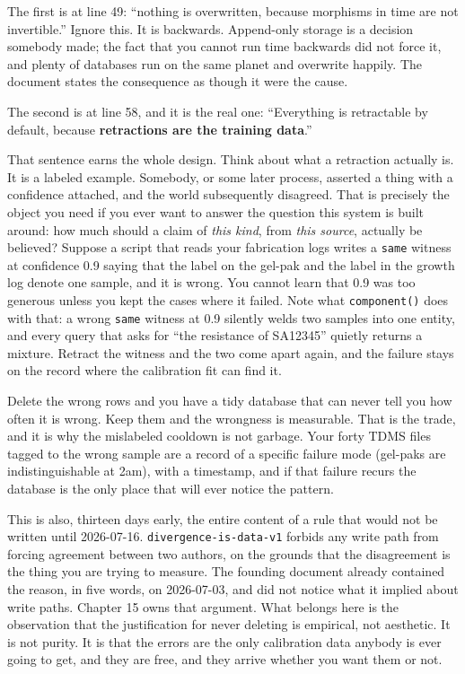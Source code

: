 The first is at line 49: ``nothing is overwritten, because morphisms in time are not invertible.'' Ignore this. It is backwards. Append-only storage is a decision somebody made; the fact that you cannot run time backwards did not force it, and plenty of databases run on the same planet and overwrite happily. The document states the consequence as though it were the cause.

The second is at line 58, and it is the real one: ``Everything is retractable by default, because \textbf{retractions are the training data}.''

That sentence earns the whole design. Think about what a retraction actually is. It is a labeled example. Somebody, or some later process, asserted a thing with a confidence attached, and the world subsequently disagreed. That is precisely the object you need if you ever want to answer the question this system is built around: how much should a claim of \emph{this kind}, from \emph{this source}, actually be believed? Suppose a script that reads your fabrication logs writes a \texttt{same} witness at confidence 0.9 saying that the label on the gel-pak and the label in the growth log denote one sample, and it is wrong. You cannot learn that 0.9 was too generous unless you kept the cases where it failed. Note what \texttt{component()} does with that: a wrong \texttt{same} witness at 0.9 silently welds two samples into one entity, and every query that asks for ``the resistance of SA12345'' quietly returns a mixture. Retract the witness and the two come apart again, and the failure stays on the record where the calibration fit can find it.

Delete the wrong rows and you have a tidy database that can never tell you how often it is wrong. Keep them and the wrongness is measurable. That is the trade, and it is why the mislabeled cooldown is not garbage. Your forty TDMS files tagged to the wrong sample are a record of a specific failure mode (gel-paks are indistinguishable at 2am), with a timestamp, and if that failure recurs the database is the only place that will ever notice the pattern.

This is also, thirteen days early, the entire content of a rule that would not be written until 2026-07-16. \texttt{divergence-is-data-v1} forbids any write path from forcing agreement between two authors, on the grounds that the disagreement is the thing you are trying to measure. The founding document already contained the reason, in five words, on 2026-07-03, and did not notice what it implied about write paths. Chapter 15 owns that argument. What belongs here is the observation that the justification for never deleting is empirical, not aesthetic. It is not purity. It is that the errors are the only calibration data anybody is ever going to get, and they are free, and they arrive whether you want them or not.

